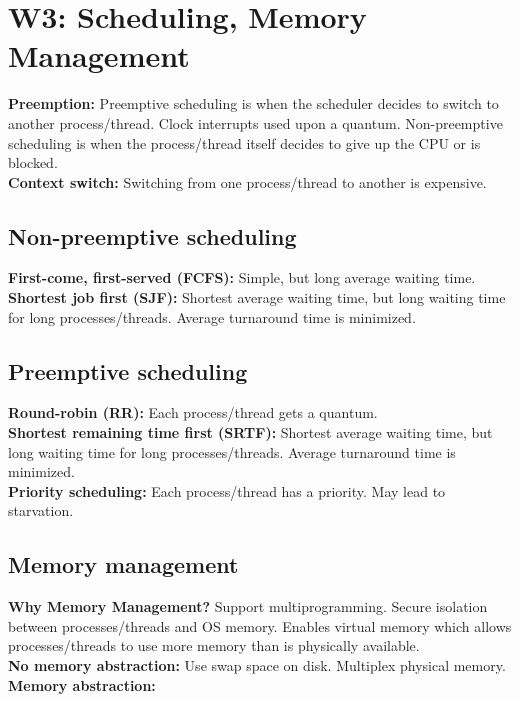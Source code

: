 \section{W3: Scheduling, Memory Management}
\textbf{Preemption:} Preemptive scheduling is when the scheduler decides to switch to another process/thread. Clock interrupts used upon a quantum. Non-preemptive scheduling is when the process/thread itself decides to give up the CPU or is blocked.\\
\textbf{Context switch:} Switching from one process/thread to another is expensive.\\

\subsection{Non-preemptive scheduling}
\textbf{First-come, first-served (FCFS):} Simple, but long average waiting time.\\
\textbf{Shortest job first (SJF):} Shortest average waiting time, but long waiting time for long processes/threads. Average turnaround time is minimized.\\

\subsection{Preemptive scheduling}
\textbf{Round-robin (RR):} Each process/thread gets a quantum.\\
\textbf{Shortest remaining time first (SRTF):} Shortest average waiting time, but long waiting time for long processes/threads. Average turnaround time is minimized.\\
\textbf{Priority scheduling:} Each process/thread has a priority. May lead to starvation.\\

\subsection{Memory management}
\textbf{Why Memory Management?} Support multiprogramming. Secure isolation between processes/threads and OS memory. Enables virtual memory which allows processes/threads to use more memory than is physically available.\\
\textbf{No memory abstraction:} Use swap space on disk. Multiplex physical memory.\\
\textbf{Memory abstraction:} 